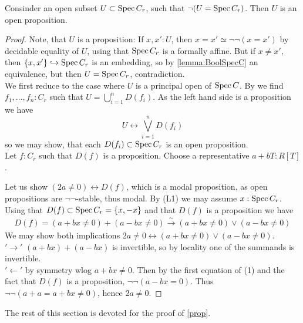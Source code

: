 \documentclass{article}
\begin{document}
\begin{lemma}{\label{lemma:heart}}
	Consinder an open subset  $U \subset \operatorname{Spec} C_r$, such that $\lnot (U =\operatorname{Spec} C_r)$. Then $U$ is an open proposition.
\end{lemma}
\begin{proof}
	Note, that $U$ is a proposition: If $x,x' : U$, then $x = x' \simeq \lnot \lnot (x = x')$ by decidable equality of $U$, using that $\operatorname{Spec} C_r$ is a formally \etale affine. But if $x \neq x'$, then $\{x,x'\} \hookrightarrow \operatorname{Spec} C_r$ is an embedding, so by \ref{lemma:BoolSpecC} an equivalence, but then $U = \operatorname{Spec} C_r$, contradiction. \\
	We first reduce to the case where $U$ is a principal open of $\operatorname{Spec} C$. By \cite{cherubini2023foundationsyntheticalgebraicgeometry} we find $f_1,\hdots,f_n : C_r$ such that $U = \bigcup_{i=1}^n D(f_i)$. As the left hand side is a proposition we have
	\[
	U \leftrightarrow \bigvee_{i=1}^n D(f_i)
	\]
	so we may show, that each $D(f_i) \subset \operatorname{Spec} C_r$ is an open proposition. \\
	Let $f : C_r$ such that $D(f)$ is a proposition. Choose a representative $a + bT : R[T]$.
	
	Let us show $(2a \neq 0) \leftrightarrow D(f)$, which is a modal proposition, as open propositions are $\lnot \lnot$-stable, thus modal. By (L1) we may assume $x : \operatorname{Spec} C_r$.
	Using that $D(f) \subset  \operatorname{Spec} C_r =  \{x,-x\}$ and that $D(f)$ is a proposition we have
	\begin{align}
	D(f) = (a+bx \neq 0) + (a-bx \neq 0) \overset{\sim}{\to} (a+bx \neq 0) \lor (a-bx \neq 0)
	\end{align}
	We may show both implications $2a \neq 0 \leftrightarrow (a+bx \neq 0) \lor (a-bx \neq 0) $. \\
	$'\rightarrow'$ $(a+bx) + (a-bx)$ is invertible, so by locality one of the summands is invertible. \\
	$'\leftarrow'$ by symmetry wlog $a + bx \neq 0$. Then by the first equation of (1) and the fact that $D(f)$ is a proposition, $\lnot \lnot (a - bx = 0)$. Thus $\lnot \lnot (a + a = a + bx \neq 0)$, hence $2 a \neq 0$. 	
\end{proof}
The rest of this section is devoted for the proof of \ref{prop}.
\end{document}
